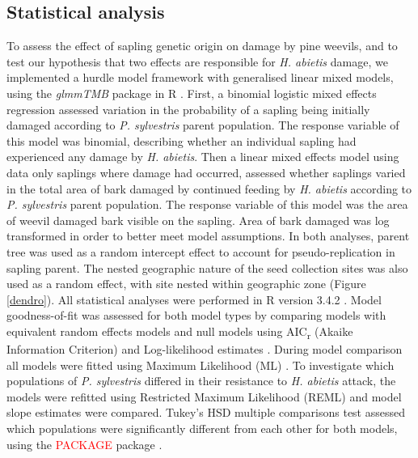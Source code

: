 \documentclass[a4paper, 11pt]{article}
\newcommand{\todo}[1]{\textcolor{red}{#1}}   %
\begin{document}
\subsection*{Statistical analysis}

To assess the effect of sapling genetic origin on damage by pine weevils, and to test our hypothesis that two effects are responsible for \textit{H. abietis} damage, we implemented a hurdle model framework with generalised linear mixed models, using the \textit{glmmTMB} package in R \citep{glmmTMB}. First, a binomial logistic mixed effects regression assessed variation in the probability of a sapling being initially damaged  according to \textit{P. sylvestris} parent population. The response variable of this model was binomial, describing whether an individual sapling had experienced any damage by \textit{H. abietis}. Then a linear mixed effects model using data only saplings where damage had occurred, assessed whether saplings varied in the total area of bark damaged by continued feeding by \textit{H. abietis} according to \textit{P. sylvestris} parent population. The response variable of this model was the area of weevil damaged bark visible on the sapling. Area of bark damaged was log transformed in order to better meet model assumptions. In both analyses, parent tree was used as a random intercept effect to account for pseudo-replication in sapling parent. The nested geographic nature of the seed collection sites was also used as a random effect, with site nested within geographic zone (Figure \ref{dendro}). All statistical analyses were performed in R version 3.4.2 \citep{RCoreTeam2019}. Model goodness-of-fit was assessed for both model types by comparing models with equivalent random effects models and null models using AIC\textsubscript{r} (Akaike Information Criterion) and Log-likelihood estimates \citep{Bolker2008}. During model comparison all models were fitted using Maximum Likelihood (ML) \citep{Bolker2008}. To investigate which populations of \textit{P. sylvestris} differed in their resistance to \textit{H. abietis} attack, the models were refitted using Restricted Maximum Likelihood (REML) and model slope estimates were compared. Tukey's HSD multiple comparisons test assessed which populations were significantly different from each other for both models, using the \todo{PACKAGE} package \citep{}.
\end{document}
